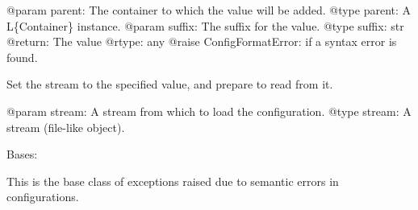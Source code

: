\documentclass[a4paper,10pt,english]{sphinxmanual}
\begin{document}
\begin{fulllineitems}
\begin{fulllineitems}
@param parent: The container to which the value will be added.
@type parent: A L\{Container\} instance.
@param suffix: The suffix for the value.
@type suffix: str
@return: The value
@rtype: any
@raise ConfigFormatError: if a syntax error is found.

\end{fulllineitems}


\begin{fulllineitems}
\label{commands/apidoc/src:src.pyconf.ConfigReader.setStream}
Set the stream to the specified value, and prepare to read from it.

@param stream: A stream from which to load the configuration.
@type stream: A stream (file-like object).

\end{fulllineitems}


\end{fulllineitems}


\begin{fulllineitems}
\label{commands/apidoc/src:src.pyconf.ConfigResolutionError}
Bases: {\hyperref[commands/apidoc/src:src.pyconf.ConfigError]{}}

This is the base class of exceptions raised due to semantic errors in
configurations.

\end{fulllineitems}

\end{document}
